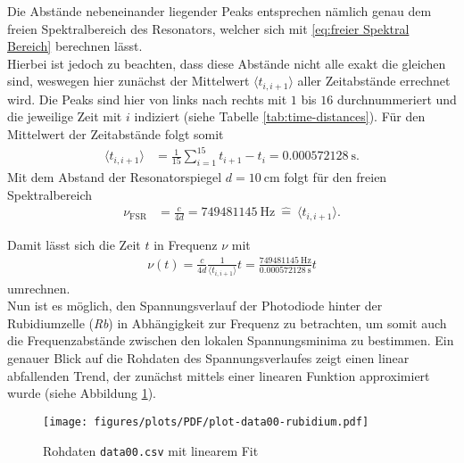 \noindent Die Abstände nebeneinander liegender Peaks entsprechen nämlich genau dem freien Spektralbereich des Resonators, welcher sich mit \eqref{eq:freier Spektral Bereich} berechnen lässt. \\
Hierbei ist jedoch zu beachten, dass diese Abstände nicht alle exakt die gleichen sind, weswegen hier zunächst der Mittelwert $\langle t_{i, i+1} \rangle$ aller Zeitabstände errechnet wird. 
Die Peaks sind hier von links nach rechts mit $1$ bis $16$ durchnummeriert und die jeweilige Zeit mit $i$ indiziert (siehe Tabelle \ref{tab:time-distances}).
Für den Mittelwert der Zeitabstände folgt somit
\begin{align}
    \langle t_{i, i+1} \rangle &= \frac{1}{15} \sum_{i = 1}^{15} t_{i+1} - t_{i} = \SI{0.000572128}{\second}. \label{eq:mean_delta_t}
\end{align}
Mit dem Abstand der Resonatorspiegel $d = \SI{10}{\centi \meter}$ folgt für den freien Spektralbereich
\begin{align}
    \nu_{\text{FSR}} &= \frac{c}{4d} = \SI{749 481 145}{\hertz} \ \hat{=} \ \langle t_{i, i+1} \rangle. \label{eq:fsr-to-mean-delta-t}
\end{align}

\noindent Damit lässt sich die Zeit $t$ in Frequenz $\nu$ mit
\begin{align}
    \nu(t) = \frac{c}{4d} \frac{1}{\langle t_{i,i+1} \rangle} t = \frac{\SI{749 481 145}{\hertz}}{\SI{0.000572128}{\second}} t
    \label{eq:time-to-freq}
\end{align}
umrechnen. \\

\noindent Nun ist es möglich, den Spannungsverlauf der Photodiode hinter der Rubidiumzelle (\textit{Rb}) in Abhängigkeit zur Frequenz zu betrachten, um somit auch die Frequenzabstände zwischen den lokalen Spannungsminima zu bestimmen. Ein genauer Blick auf die Rohdaten des Spannungsverlaufes zeigt einen linear abfallenden Trend, der zunächst mittels einer linearen Funktion approximiert wurde (siehe Abbildung \ref{fig:plot-data00-rubidium}).
\begin{figure}[H]
    \centering
    \texttt{[image: figures/plots/PDF/plot-data00-rubidium.pdf]}
    \caption{Rohdaten \lstinline{data00.csv} mit linearem Fit}
    \label{fig:plot-data00-rubidium}
\end{figure}

